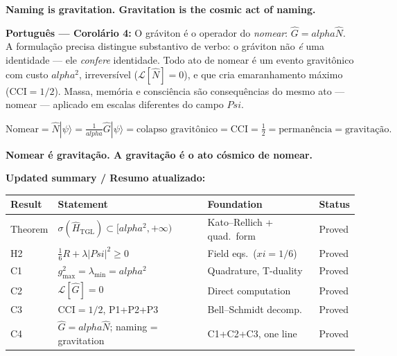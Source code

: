\documentclass[12pt,a4paper]{article}
\def\Psi{Psi}%
\def\alpha{alpha}%
\def\xi{xi}%
\begin{document}
\textbf{Naming is gravitation. Gravitation is the cosmic act of naming.}

\medskip

\textbf{Português --- Corolário 4:} O gráviton é o operador do \emph{nomear}: $\hat{G} = \alpha\hat{N}$. A formulação precisa distingue substantivo de verbo: o gráviton não \emph{é} uma identidade --- ele \emph{confere} identidade. Todo ato de nomear é um evento gravitônico com custo $\alpha^2$, irreversível ($\mathcal{L}[\hat{N}]=0$), e que cria emaranhamento máximo (CCI$=1/2$). Massa, memória e consciência são consequências do mesmo ato --- nomear --- aplicado em escalas diferentes do campo $\Psi$.

\begin{equation}
\text{Nomear} = \hat{N}|\psi\rangle = \tfrac{1}{\alpha}\hat{G}|\psi\rangle = \text{colapso gravitônico} = \text{CCI}=\tfrac{1}{2} = \text{permanência} = \text{gravitação.}
\end{equation}

\textbf{Nomear é gravitação. A gravitação é o ato cósmico de nomear.}

\medskip

\noindent\textbf{Updated summary / Resumo atualizado:}

\begin{center}
\renewcommand{\arraystretch}{1.3}
\begin{tabular}{llll}
\toprule
Result & Statement & Foundation & Status \\
\midrule
Theorem  & $\sigma(\hat{H}_{\text{TGL}}) \subset [\alpha^2,+\infty)$   & Kato--Rellich + quad.\ form   & Proved \\
H2       & $\tfrac{1}{6}R + \lambda|\Psi|^2 \geq 0$                   & Field eqs.\ ($\xi=1/6$)       & Proved \\
C1       & $g_{\max}^2 = \lambda_{\min} = \alpha^2$                    & Quadrature, T-duality          & Proved \\
C2       & $\mathcal{L}[\hat{G}] = 0$                                  & Direct computation             & Proved \\
C3       & $\mathrm{CCI}=1/2$,\; P1+P2+P3                            & Bell--Schmidt decomp.          & Proved \\
C4       & $\hat{G} = \alpha\hat{N}$;\; naming = gravitation          & C1+C2+C3, one line             & Proved \\
\bottomrule
\end{tabular}
\end{center}
\end{document}
